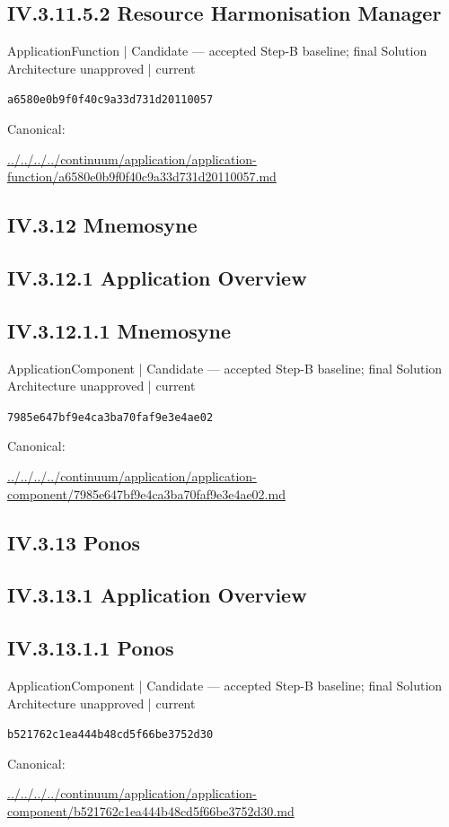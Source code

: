 \documentclass[10pt,a4paper]{article}
\begin{document}
\subsection*{IV.3.11.5.2 Resource Harmonisation Manager}
\label{element-a6580e0b9f0f40c9a33d731d20110057}
{\small ApplicationFunction | Candidate — accepted Step-B baseline; final Solution Architecture unapproved | current}\par
\texttt{a6580e0b9f0f40c9a33d731d20110057}\par
Canonical: \par
{\footnotesize\url{../../../../continuum/application/application-function/a6580e0b9f0f40c9a33d731d20110057.md}}\par
\subsection*{IV.3.12 Mnemosyne}
\subsection*{IV.3.12.1 Application Overview}
\subsection*{IV.3.12.1.1 Mnemosyne}
\label{element-7985e647bf9e4ca3ba70faf9e3e4ae02}
{\small ApplicationComponent | Candidate — accepted Step-B baseline; final Solution Architecture unapproved | current}\par
\texttt{7985e647bf9e4ca3ba70faf9e3e4ae02}\par
Canonical: \par
{\footnotesize\url{../../../../continuum/application/application-component/7985e647bf9e4ca3ba70faf9e3e4ae02.md}}\par
\subsection*{IV.3.13 Ponos}
\subsection*{IV.3.13.1 Application Overview}
\subsection*{IV.3.13.1.1 Ponos}
\label{element-b521762c1ea444b48cd5f66be3752d30}
{\small ApplicationComponent | Candidate — accepted Step-B baseline; final Solution Architecture unapproved | current}\par
\texttt{b521762c1ea444b48cd5f66be3752d30}\par
Canonical: \par
{\footnotesize\url{../../../../continuum/application/application-component/b521762c1ea444b48cd5f66be3752d30.md}}\par
\end{document}
